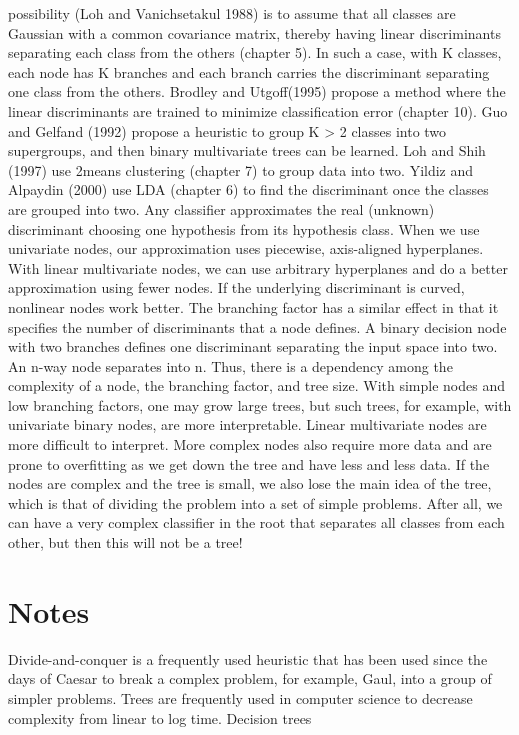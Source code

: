 possibility (Loh and Vanichsetakul 1988) is to assume that all classes are Gaussian with a common covariance matrix, thereby having linear discriminants separating each class from the others (chapter 5). In such a case, with K classes, each node has K branches and each branch carries the discriminant separating one class from the others. Brodley and Utgoff(1995) propose a method where the linear discriminants are trained to minimize classification error (chapter 10). Guo and Gelfand (1992) propose a heuristic to group K > 2 classes into two supergroups, and then binary multivariate trees can be learned. Loh and Shih (1997) use 2means clustering (chapter 7) to group data into two. Yildiz and Alpaydin (2000) use LDA (chapter 6) to find the discriminant once the classes are grouped into two. Any classifier approximates the real (unknown) discriminant choosing one hypothesis from its hypothesis class. When we use univariate nodes, our approximation uses piecewise, axis-aligned hyperplanes. With linear multivariate nodes, we can use arbitrary hyperplanes and do a better approximation using fewer nodes. If the underlying discriminant is curved, nonlinear nodes work better. The branching factor has a similar effect in that it specifies the number of discriminants that a node defines. A binary decision node with two branches defines one discriminant separating the input space into two. An n-way node separates into n. Thus, there is a dependency among the complexity of a node, the branching factor, and tree size. With simple nodes and low branching factors, one may grow large trees, but such trees, for example, with univariate binary nodes, are more interpretable. Linear multivariate nodes are more difficult to interpret. More complex nodes also require more data and are prone to overfitting as we get down the tree and have less and less data. If the nodes are complex and the tree is small, we also lose the main idea of the tree, which is that of dividing the problem into a set of simple problems. After all, we can have a very complex classifier in the root that separates all classes from each other, but then this will not be a tree!

\section{Notes}

Divide-and-conquer is a frequently used heuristic that has been used since the days of Caesar to break a complex problem, for example, Gaul, into a group of simpler problems. Trees are frequently used in computer science to decrease complexity from linear to log time. Decision trees

